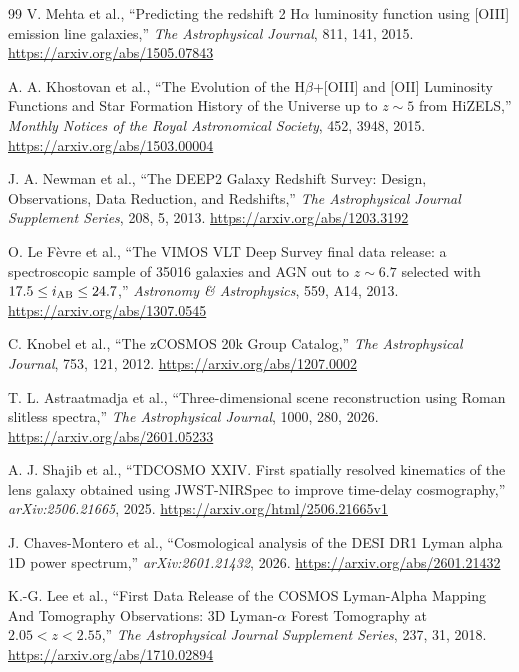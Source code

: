\begin{thebibliography}{99}
V. Mehta et al.,
``Predicting the redshift 2 H$\alpha$ luminosity function using [OIII] emission line galaxies,''
\emph{The Astrophysical Journal}, 811, 141, 2015.
\url{https://arxiv.org/abs/1505.07843}

A. A. Khostovan et al.,
``The Evolution of the H$\beta$+[OIII] and [OII] Luminosity Functions and Star Formation History of the Universe up to $z\sim5$ from HiZELS,''
\emph{Monthly Notices of the Royal Astronomical Society}, 452, 3948, 2015.
\url{https://arxiv.org/abs/1503.00004}

J. A. Newman et al.,
``The DEEP2 Galaxy Redshift Survey: Design, Observations, Data Reduction, and Redshifts,''
\emph{The Astrophysical Journal Supplement Series}, 208, 5, 2013.
\url{https://arxiv.org/abs/1203.3192}

O. Le F\`evre et al.,
``The VIMOS VLT Deep Survey final data release: a spectroscopic sample of 35016 galaxies and AGN out to $z\sim6.7$ selected with $17.5\le i_{\rm AB}\le24.7$,''
\emph{Astronomy \& Astrophysics}, 559, A14, 2013.
\url{https://arxiv.org/abs/1307.0545}

C. Knobel et al.,
``The zCOSMOS 20k Group Catalog,''
\emph{The Astrophysical Journal}, 753, 121, 2012.
\url{https://arxiv.org/abs/1207.0002}

T. L. Astraatmadja et al.,
``Three-dimensional scene reconstruction using Roman slitless spectra,''
\emph{The Astrophysical Journal}, 1000, 280, 2026.
\url{https://arxiv.org/abs/2601.05233}

A. J. Shajib et al.,
``TDCOSMO XXIV. First spatially resolved kinematics of the lens galaxy obtained using JWST-NIRSpec to improve time-delay cosmography,''
\emph{arXiv:2506.21665}, 2025.
\url{https://arxiv.org/html/2506.21665v1}

J. Chaves-Montero et al.,
``Cosmological analysis of the DESI DR1 Lyman alpha 1D power spectrum,''
\emph{arXiv:2601.21432}, 2026.
\url{https://arxiv.org/abs/2601.21432}

K.-G. Lee et al.,
``First Data Release of the COSMOS Lyman-Alpha Mapping And Tomography Observations: 3D Lyman-$\alpha$ Forest Tomography at $2.05<z<2.55$,''
\emph{The Astrophysical Journal Supplement Series}, 237, 31, 2018.
\url{https://arxiv.org/abs/1710.02894}


\end{thebibliography}
